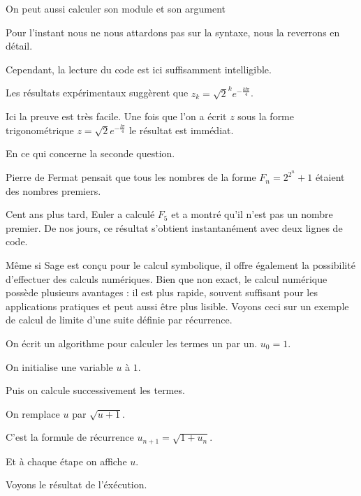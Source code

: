 \change
On peut aussi calculer son module et son argument

Pour l'instant nous ne nous attardons pas sur la syntaxe, nous la reverrons en détail. 

Cependant, la lecture du code est ici suffisamment intelligible.

\change
Les résultats expérimentaux suggèrent que
$z_k = \sqrt{2}^k e^{-\frac{k\ii\pi}{4}}$. 

\change
Ici la preuve est très facile. Une fois que l'on a écrit $z$
sous la forme trigonométrique 
$z = \sqrt{2} e^{-\frac{\ii\pi}{4}}$ le résultat est immédiat.



\diapo

En ce qui concerne la seconde question. 

Pierre de Fermat pensait que tous les nombres de la forme 
$F_n = 2^{2^n}+1$ étaient des nombres premiers.

\change
Cent ans plus tard, Euler a calculé $F_5$ et a montré qu'il n'est pas un 
nombre premier. De nos jours, ce résultat s'obtient instantanément
avec deux lignes de code.



\diapo

Même si Sage est conçu pour le calcul symbolique, 
il offre également la possibilité d'effectuer des calculs numériques. 
Bien que non exact, le calcul numérique possède plusieurs avantages :
il est plus rapide, souvent suffisant pour les applications 
pratiques et peut aussi être plus lisible.  
Voyons ceci sur un exemple de calcul de limite 
d'une suite définie par récurrence.


\change

On écrit un algorithme pour calculer les termes un par un.
$u_0 = 1$.

\change
On initialise une variable $u$ à $1$.

\change
Puis on calcule successivement les termes.

\change
On remplace $u$ par $\sqrt{u+1}$.

C'est la formule de récurrence $u_{n+1} = \sqrt{1+u_n}$.

Et à chaque étape on affiche $u$.

Voyons le résultat de l'éxécution.

\change

\change

